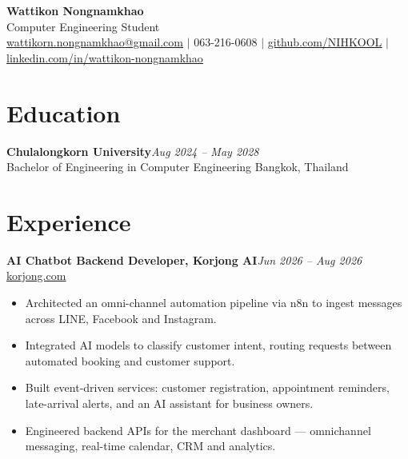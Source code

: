 \documentclass[11pt,a4paper]{article}
\let\oldhref\href
\renewcommand{\href}[2]{\oldhref{#1}{\uline{#2}}}
\newcommand{\entry}[2]{\textbf{#1}\hfill\textit{#2}\\}
\begin{document}
\begin{center}
  {\huge\bfseries Wattikon Nongnamkhao}\\[4pt]
  {\large Computer Engineering Student}\\[6pt]
  \href{mailto:wattikorn.nongnamkhao@gmail.com}{wattikorn.nongnamkhao@gmail.com} $\mid$ 063-216-0608 $\mid$
  \href{https://github.com/NIHKOOL}{github.com/NIHKOOL} $\mid$
  \href{https://linkedin.com/in/wattikon-nongnamkhao}{linkedin.com/in/wattikon-nongnamkhao}
\end{center}

\section{Education}
\entry{Chulalongkorn University}{Aug 2024 -- May 2028}
Bachelor of Engineering in Computer Engineering \textperiodcentered{} Bangkok, Thailand

\section{Experience}
\entry{AI Chatbot Backend Developer, Korjong AI}{Jun 2026 -- Aug 2026}
\href{https://korjong.com}{korjong.com}
\begin{itemize}
  \item Architected an omni-channel automation pipeline via n8n to ingest messages across LINE, Facebook and Instagram.
  \item Integrated AI models to classify customer intent, routing requests between automated booking and customer support.
  \item Built event-driven services: customer registration, appointment reminders, late-arrival alerts, and an AI assistant for business owners.
  \item Engineered backend APIs for the merchant dashboard --- omnichannel messaging, real-time calendar, CRM and analytics.
\end{itemize}

\end{document}
